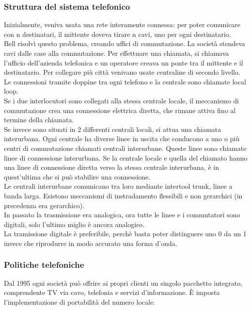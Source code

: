 \documentclass{article}
\begin{document}
		\subsubsection{Struttura del sistema telefonico}
		Inizialmente, veniva usata una rete interamente connessa: per poter comunicare con n destinatari, il mittente doveva tirare n cavi, uno per ogni destinatario. \\
		Bell risolvì questo problema, creando uffici di commutazione. La società stendeva cavi dalle case alla commutazione. Per effettuare una chiamata, si chiamava l'ufficio dell'azienda telefonica e un operatore creava un ponte tra il mittente e il destinatario. Per collegare più città venivano usate centraline di secondo livello.\\
		Le connessioni tramite doppine tra ogni telefono e la centrale sono chiamate local loop.\\
		Se i due interlocutori sono collegati alla stessa centrale locale, il meccanismo di commutazione crea una connessione elettrica diretta, che rimane attiva fino al termine della chiamata.\\
		Se invece sono situati in 2 differenti centrali locali, si attua una chiamata interurbana. Ogni centrale ha diverse linee in uscita che conducono a uno o più centri di commutazione chiamati centrali interurbane. Queste linee sono chiamate linee di connessione interurbana. Se la centrale locale e quella del chiamato hanno una linee di connessione diretta verso la stessa centrale interurbana, è in quest'ultima che si può stabilire una connessione. \\
		Le centrali interurbane comunicano tra loro mediante intertool trunk, linee a banda larga. Esistono meccanismi di instradamento flessibili e non gerarchici (in precedenza era gerarchico). \\
		In passato la trasmissione era analogica, ora tutte le linee e i commutatori sono digitali, solo l'ultimo miglio è ancora analogico. \\
		La tramissione digitale è preferibile, perchè basta poter distinguere uno 0 da un 1 invece che riprodurre in modo accurato una forma d'onda.
		\subsubsection{Politiche telefoniche}
		Dal 1995 ogni società può offrire ai propri clienti un singolo pacchetto integrato, comprendente TV via cavo, telefonia e servizi d'informazione. È imposta l'implementazione  di portabilità del numero locale.
\end{document}
